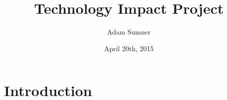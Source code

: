 \documentclass[12pt,letter]{article}
\title{\textbf{Technology Impact Project}}
\author{Adam Sumner}
\date{April 20th, 2015}
\begin{document}
\maketitle

\begin{abstract}

\end{abstract}

\section{Introduction}
\end{document}
